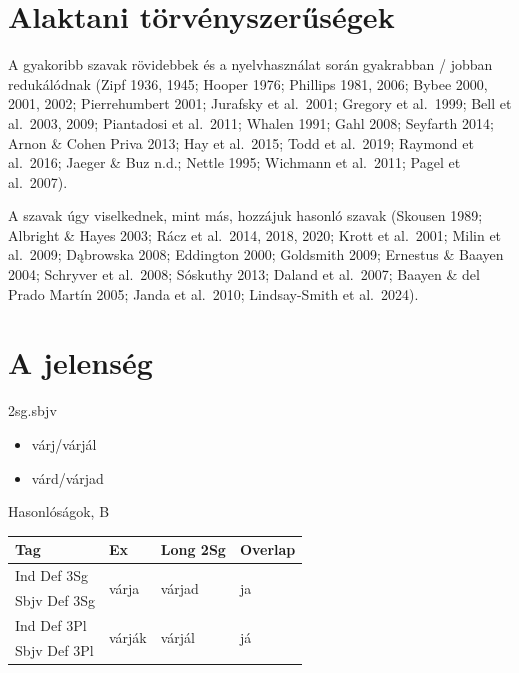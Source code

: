 \section{Alaktani
törvényszerűségek}\label{alaktani-tuxf6rvuxe9nyszerux171suxe9gek}

\begin{frame}
A gyakoribb szavak rövidebbek és a nyelvhasználat során gyakrabban /
jobban redukálódnak (Zipf 1936, 1945; Hooper 1976; Phillips 1981, 2006;
Bybee 2000, 2001, 2002; Pierrehumbert 2001; Jurafsky et al.~2001;
Gregory et al.~1999; Bell et al.~2003, 2009; Piantadosi et al.~2011;
Whalen 1991; Gahl 2008; Seyfarth 2014; Arnon \& Cohen Priva 2013; Hay et
al.~2015; Todd et al.~2019; Raymond et al.~2016; Jaeger \& Buz n.d.;
Nettle 1995; Wichmann et al.~2011; Pagel et al.~2007).
\end{frame}

\begin{frame}
A szavak úgy viselkednek, mint más, hozzájuk hasonló szavak (Skousen
1989; Albright \& Hayes 2003; Rácz et al.~2014, 2018, 2020; Krott et
al.~2001; Milin et al.~2009; Dąbrowska 2008; Eddington 2000; Goldsmith
2009; Ernestus \& Baayen 2004; Schryver et al.~2008; Sóskuthy 2013;
Daland et al.~2007; Baayen \& del Prado Martín 2005; Janda et al.~2010;
Lindsay-Smith et al.~2024).
\end{frame}

\section{A jelenség}\label{a-jelensuxe9g}

\begin{frame}{2sg.sbjv}
\protect{}\label{sg.sbjv}
\begin{itemize}
\tightlist
\item
  várj/várjál
\item
  várd/várjad
\end{itemize}
\end{frame}

\begin{frame}{Hasonlóságok, B}
\protect{}\label{hasonluxf3suxe1gok-b}
\begin{table}
\centering
\begin{tabular}{llll}
\toprule
\textbf{Tag} & \textbf{Ex} & \textbf{Long 2Sg} & \textbf{Overlap} \\
\midrule
Ind Def 3Sg & \multirow{2}{*}{várja} & \multirow{2}{*}{várjad} & \multirow{2}{*}{ja} \\
Sbjv Def 3Sg & & & \\
Ind Def 3Pl & \multirow{2}{*}{várják} & \multirow{2}{*}{várjál} & \multirow{2}{*}{já} \\
Sbjv Def 3Pl & & & \\
\bottomrule
\end{tabular}
\end{table}
\end{frame}


